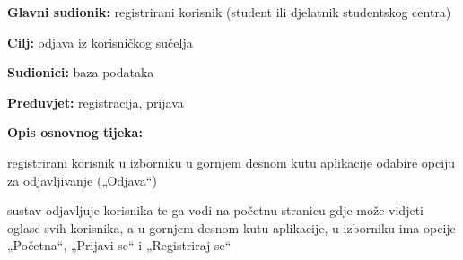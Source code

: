	\noindent {}
	\begin{packed_item}
		
		\item \textbf{Glavni sudionik: } registrirani korisnik (student ili djelatnik studentskog centra)
		\item  \textbf{Cilj:} odjava iz korisničkog sučelja
		\item  \textbf{Sudionici:} baza podataka
		\item  \textbf{Preduvjet:} registracija, prijava
		\item  \textbf{Opis osnovnog tijeka:}
		
		\item[] \begin{packed_enum}
			
			\item registrirani korisnik u izborniku u gornjem desnom kutu aplikacije odabire opciju za odjavljivanje („Odjava“)	
			\item sustav odjavljuje korisnika te ga vodi na početnu stranicu gdje može vidjeti oglase svih korisnika, a u gornjem desnom kutu aplikacije, u izborniku ima opcije  „Početna“, „Prijavi se“ i „Registriraj se“ 
		\end{packed_enum}
	
	\end{packed_item}

